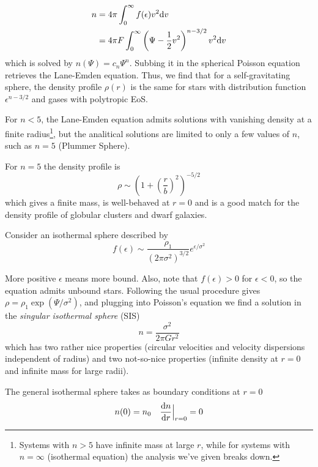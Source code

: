 \begin{align*}
    n &= 4\pi \int_{0}^{\infty} f(\epsilon)v^{2}\text{d}v\\
    &= 4\pi F\int_{0}^{\infty}\left(\Psi - \frac{1}{2}v^{2}\right)^{n-3/2}v^{2}\text{d}v
\end{align*}
which is solved by $n(\Psi) = c_{n}\Psi^{n}$. Subbing it in the spherical Poisson equation retrieves the Lane-Emden equation. Thus, we find that for a self-gravitating sphere, the density profile $\rho(r)$ is the same for stars with distribution function $\epsilon^{n-3/2}$ and gases with polytropic EoS.
\par For $n<5$, the Lane-Emden equation admits solutions with vanishing density at a finite radius\footnote{Systems with $n>5$ have infinite mass at large $r$, while for systems with $n=\infty$ (isothermal equation) the analysis we've given breaks down.}, but the analitical solutions are limited to only a few values of $n$, such as $n=5$ (Plummer Sphere).
\par For $n=5$ the density profile is 
\begin{equation*}
    \rho \sim \left(1+\left(\frac{r}{b}\right)^{2}\right)^{-5/2}
\end{equation*}
which gives a finite mass, is well-behaved at $r=0$ and is a good match for the density profile of globular clusters and dwarf galaxies.
\par Consider an isothermal sphere described by
\begin{equation*}
    f(\epsilon)\sim \frac{\rho_{1}}{(2\pi \sigma^{2})^{3/2}}e^{\epsilon/\sigma^{2}}
\end{equation*}
\par More positive $\epsilon$ means more bound. Also, note that $f(\epsilon) > 0$ for $\epsilon <0$, so the equation admits unbound stars. Following the usual procedure gives $\rho = \rho_{1}\exp(\Psi/\sigma^{2})$, and plugging into Poisson's equation we find a solution in the \emph{singular isothermal sphere} (SIS)
\begin{equation*}
    n = \frac{\sigma^{2}}{2\pi G r^{2}}
\end{equation*}
which has two rather nice properties (circular velocities and velocity dispersions independent of radius) and two not-so-nice properties (infinite density at $r=0$ and infinite mass for large radii).
\par The general isothermal sphere takes as boundary conditions at $r=0$
\begin{equation*}
    n(0) = n_{0} \quad \frac{\text{d}n}{\text{d}r}\Big|_{r=0} = 0
\end{equation*}
